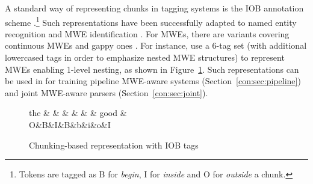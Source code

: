 \documentclass[output=paper]{langsci/langscibook}
\begin{document}
A standard way of representing chunks in tagging systems is the IOB annotation scheme \citep{ramshaw1995}.\footnote{Tokens are tagged as B for \emph{begin}, I for \emph{inside} and O for \emph{outside} a chunk.} Such representations have been successfully adapted to named entity recognition \citep{tjong2002} and MWE identification \citep{vincze11,constant12acl}. For MWEs, there are variants covering continuous MWEs \citep{blunsom-baldwin:2006:emnlp} and gappy ones \citep{schneider14mwe}.
For instance, \citet{schneider14mwe} use a 6-tag set (with additional lowercased tags in order to emphasize nested MWE structures) to represent MWEs enabling 1-level nesting, as shown in Figure~\ref{con:fig:iob}. Such representations can be used in  for training pipeline MWE-aware systems (Section~\ref{con:sec:pipeline}) and joint MWE-aware parsers (Section~\ref{con:sec:joint}).


\begin{figure}[t]
\small
\begin{center}
\begin{dependency}[edge unit distance=2ex]
\begin{deptext}[column sep=.7cm]
the \& \color{red}{prime} \& \color{red}{minister} \& \color{blue}{made} \& \color{orange}{a} \& \color{orange}{few} \& good \& \color{blue}{decisions} \\
O\&\color{red}B\&\color{red}I\&\color{blue}B\&\color{orange}b\&\color{orange}i\&o\&\color{blue}I\\
\end{deptext}
\end{dependency}
\vspace{-0.3cm}
\caption{Chunking-based representation with IOB tags \citep{schneider14mwe}}
\label{con:fig:iob}
\end{center}
\end{figure}

\end{document}
